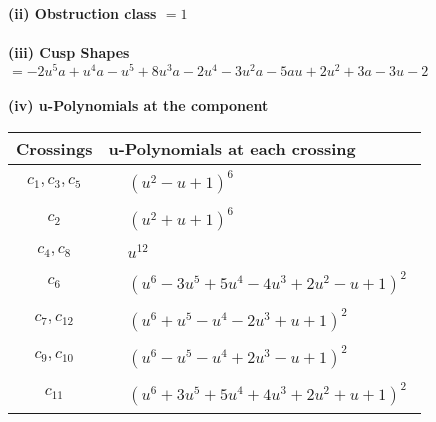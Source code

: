 \documentclass[1p]{elsarticle_modified}
\theoremstyle{definition}
\begin{document}
\flushleft \textbf{(ii) Obstruction class $= 1$}\\~\\
\flushleft \textbf{(iii) Cusp Shapes $= -2 u^5 a+u^4 a- u^5+8 u^3 a-2 u^4-3 u^2 a-5 a u+2 u^2+3 a-3 u-2$}\\~\\
\newpage\renewcommand{\arraystretch}{1}
\flushleft \textbf{(iv) u-Polynomials at the component}\newline \\
\begin{tabular}{m{50pt}|m{274pt}}
Crossings & \hspace{64pt}u-Polynomials at each crossing \\
\hline $$\begin{aligned}c_{1},c_{3},c_{5}\end{aligned}$$&$\begin{aligned}
&(u^2- u+1)^6
\end{aligned}$\\
\hline $$\begin{aligned}c_{2}\end{aligned}$$&$\begin{aligned}
&(u^2+u+1)^6
\end{aligned}$\\
\hline $$\begin{aligned}c_{4},c_{8}\end{aligned}$$&$\begin{aligned}
&u^{12}
\end{aligned}$\\
\hline $$\begin{aligned}c_{6}\end{aligned}$$&$\begin{aligned}
&(u^6-3 u^5+5 u^4-4 u^3+2 u^2- u+1)^2
\end{aligned}$\\
\hline $$\begin{aligned}c_{7},c_{12}\end{aligned}$$&$\begin{aligned}
&(u^6+u^5- u^4-2 u^3+u+1)^2
\end{aligned}$\\
\hline $$\begin{aligned}c_{9},c_{10}\end{aligned}$$&$\begin{aligned}
&(u^6- u^5- u^4+2 u^3- u+1)^2
\end{aligned}$\\
\hline $$\begin{aligned}c_{11}\end{aligned}$$&$\begin{aligned}
&(u^6+3 u^5+5 u^4+4 u^3+2 u^2+u+1)^2
\end{aligned}$\\
\hline
\end{tabular}\\~\\
\end{document}
